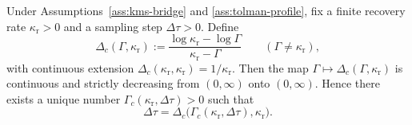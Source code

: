 \begin{theorem}\label{thm:memory-surface}
Under Assumptions~\ref{ass:kms-bridge} and \ref{ass:tolman-profile}, fix a finite recovery rate $\kappa_{\mathrm r}>0$ and a sampling step $\Delta\tau>0$. Define
\[
\Delta_c(\Gamma,\kappa_{\mathrm r})
:=
\frac{\log\kappa_{\mathrm r}-\log\Gamma}{\kappa_{\mathrm r}-\Gamma}
\qquad
(\Gamma\neq\kappa_{\mathrm r}),
\]
with continuous extension $\Delta_c(\kappa_{\mathrm r},\kappa_{\mathrm r})=1/\kappa_{\mathrm r}$. Then the map $\Gamma\mapsto \Delta_c(\Gamma,\kappa_{\mathrm r})$ is continuous and strictly decreasing from $(0,\infty)$ onto $(0,\infty)$. Hence there exists a unique number $\Gamma_c(\kappa_{\mathrm r},\Delta\tau)>0$ such that
\begin{equation}\label{eq:memory-critical-rate}
\Delta\tau=\Delta_c\bigl(\Gamma_c(\kappa_{\mathrm r},\Delta\tau),\kappa_{\mathrm r}\bigr).
\end{equation}


\end{theorem}
